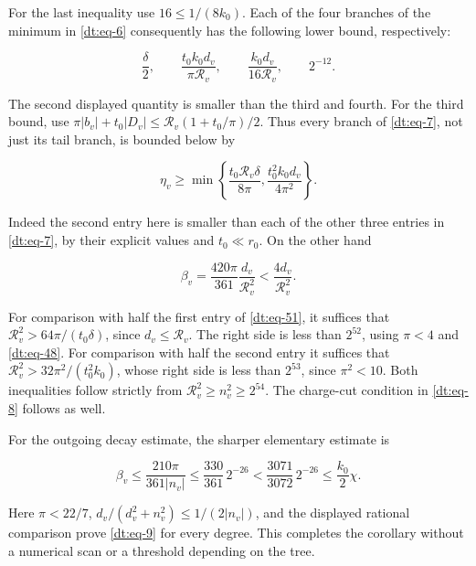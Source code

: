 For the last inequality use \(16\le1/(8k_0)\). Each of the four
branches of the minimum in \eqref{dt:eq-6} consequently has the following lower
bound, respectively:

\begin{equation}\label{dt:eq-50}
\frac\delta2,\qquad
 \frac{t_0k_0d_v}{\pi\mathcal R_v},\qquad
 \frac{k_0d_v}{16\mathcal R_v},\qquad 2^{-12}.
\end{equation}

The second displayed quantity is smaller than the third and fourth.
For the third bound, use
\(\pi|b_v|+t_0|D_v|\le\mathcal R_v(1+t_0/\pi)/2\).
Thus every branch of \eqref{dt:eq-7}, not just its tail branch, is bounded below by

\begin{equation}\label{dt:eq-51}
\eta_v\ge\min\left\{
       \frac{t_0\mathcal R_v\delta}{8\pi},
       \frac{t_0^2 k_0d_v}{4\pi^2}\right\}.
\end{equation}

Indeed the second entry here is smaller than each of the other three
entries in \eqref{dt:eq-7}, by their explicit values and \(t_0\ll r_0\).
On the other hand

\begin{equation}\label{dt:eq-52}
\beta_v=\frac{420\pi}{361}\frac{d_v}{\mathcal R_v^2}
                       <\frac{4d_v}{\mathcal R_v^2}.
\end{equation}

For comparison with half the first entry of \eqref{dt:eq-51}, it suffices that
\(\mathcal R_v^2>64\pi/(t_0\delta)\), since \(d_v\le\mathcal R_v\).
The right side is less than \(2^{52}\), using \(\pi<4\) and \eqref{dt:eq-48}.
For comparison with half the second entry it suffices that
\(\mathcal R_v^2>32\pi^2/(t_0^2k_0)\), whose right side is less
than \(2^{53}\), since \(\pi^2<10\). Both inequalities follow
strictly from \(\mathcal R_v^2\ge n_v^2\ge2^{54}\).
The charge-cut condition in \eqref{dt:eq-8} follows as well.

For the outgoing decay estimate, the sharper elementary estimate is

\begin{equation}\label{dt:eq-53}
\beta_v\le\frac{210\pi}{361|n_v|}
 \le\frac{330}{361}\,2^{-26}
 <\frac{3071}{3072}\,2^{-26}
 \le\frac{k_0}2\chi.
\end{equation}

Here \(\pi<22/7\),
\(d_v/(d_v^2+n_v^2)\le1/(2|n_v|)\), and the displayed rational
comparison prove \eqref{dt:eq-9} for every degree. This completes the corollary
without a numerical scan or a threshold depending on the tree.

